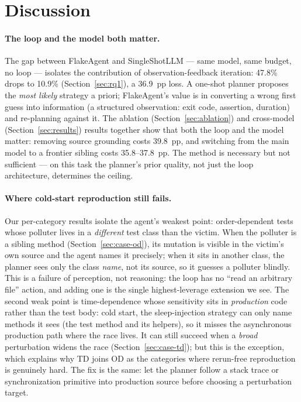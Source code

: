 \section{Discussion}
\label{sec:discussion}

\paragraph{The loop and the model both matter.}
The gap between FlakeAgent and SingleShotLLM — same model, same budget, no
loop — isolates the contribution of observation-feedback iteration: 47.8\%
drops to 10.9\% (Section~\ref{sec:rq1}), a 36.9~pp loss. A one-shot planner
proposes the \emph{most likely} strategy a priori; FlakeAgent's value is in
converting a wrong first guess into information (a structured observation:
exit code, assertion, duration) and re-planning against it. The ablation
(Section~\ref{sec:ablation}) and cross-model (Section~\ref{sec:results})
results together show that both the loop and the model matter: removing
source grounding costs 39.8~pp, and switching from the main model to a
frontier sibling costs 35.8--37.8~pp. The method is necessary but not
sufficient — on this task the planner's prior quality, not just the loop
architecture, determines the ceiling.

\paragraph{Where cold-start reproduction still fails.}
Our per-category results isolate the agent's weakest point: order-dependent
tests whose polluter lives in a \emph{different} test class than the victim.
When the polluter is a sibling method (Section~\ref{sec:case-od}), its
mutation is visible in the victim's own source and the agent names it
precisely; when it sits in another class, the planner sees only the class
\emph{name}, not its source, so it guesses a polluter blindly. This is a
failure of perception, not reasoning: the loop has no ``read an arbitrary
file'' action, and adding one is the single highest-leverage extension we see.
The second weak point is time-dependence whose sensitivity sits in
\emph{production} code rather than the test body: cold start, the
sleep-injection strategy can only name methods it sees (the test method and
its helpers), so it misses the asynchronous production path where the race
lives. It can still succeed when a \emph{broad} perturbation widens the race
(Section~\ref{sec:case-td}); but this is the exception, which explains why TD
joins OD as the categories where rerun-free reproduction is genuinely hard.
The fix is the same: let the planner follow a stack trace or synchronization
primitive into production source before choosing a perturbation target.

